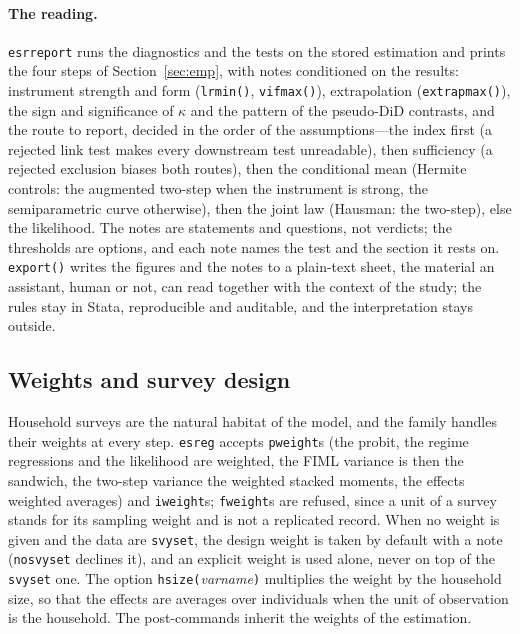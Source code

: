 \documentclass[11pt,a4paper]{article}
\theoremstyle{plain}
\theoremstyle{definition}
\theoremstyle{remark}
\newcommand{\1}{\mathbf{1}}
\newcommand{\cmd}[1]{\texttt{#1}}
\begin{document}
\paragraph{The reading.}
\cmd{esrreport} runs the diagnostics and the tests on the stored
estimation and prints the four steps of Section~\ref{sec:emp}, with
notes conditioned on the results: instrument strength and form
(\cmd{lrmin()}, \cmd{vifmax()}), extrapolation (\cmd{extrapmax()}), the
sign and significance of $\kappa$ and the pattern of the pseudo-DiD
contrasts, and the route to report, decided in the order of the
assumptions---the index first (a rejected link test makes every
downstream test unreadable), then sufficiency (a rejected exclusion
biases both routes), then the conditional mean (Hermite controls: the
augmented two-step when the instrument is strong, the semiparametric
curve otherwise), then the joint law (Hausman: the two-step),
else the likelihood. The notes are statements and questions, not
verdicts; the thresholds are options, and each note names the test and
the section it rests on. \cmd{export()} writes the figures and the
notes to a plain-text sheet, the material an assistant, human or not,
can read together with the context of the study; the rules stay in
Stata, reproducible and auditable, and the interpretation stays
outside.

\subsection{Weights and survey design}\label{sec:cmd:svy}

Household surveys are the natural habitat of the model, and the family
handles their weights at every step. \cmd{esreg} accepts
\cmd{pweight}s (the probit, the regime regressions and the likelihood
are weighted, the FIML variance is then the sandwich, the two-step
variance the weighted stacked moments, the effects weighted averages)
and \cmd{iweight}s; \cmd{fweight}s are refused, since a unit of a survey
stands for its sampling weight and is not a replicated record. When no
weight is given and the
data are \cmd{svyset}, the design weight is taken by default with a
note (\cmd{nosvyset} declines it), and an explicit weight is used
alone, never on top of the \cmd{svyset} one. The option
\cmd{hsize(}\textit{varname}\cmd{)} multiplies the weight by the
household size, so that the effects are averages over individuals when
the unit of observation is the household. The post-commands inherit the
weights of the estimation.
\end{document}
